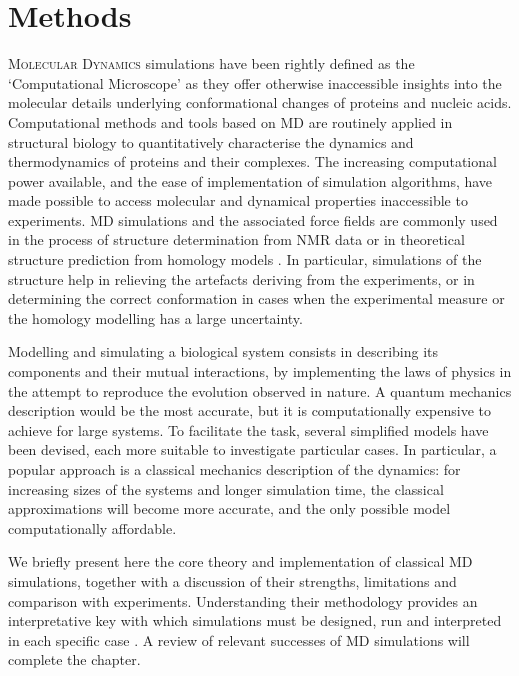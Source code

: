 \chapter{Methods} \label{chapter:MD}

\lettrine{M}{olecular Dynamics} simulations have been rightly defined as the `Computational Microscope' \citep{Lee2009,Dror2012} as they offer otherwise inaccessible insights into the molecular details underlying conformational changes of proteins and nucleic acids. Computational methods and tools based on MD are routinely applied in structural biology to quantitatively characterise the dynamics and thermodynamics of proteins and their complexes. The increasing computational power available, and the 
ease of implementation of simulation algorithms,
have made possible to access molecular and dynamical properties inaccessible to experiments. MD simulations and the associated force fields are commonly used in the process of structure determination from NMR data or in theoretical structure prediction from homology models \citep{Vogel2017,Heo2018}. In particular, simulations of the structure help in relieving the artefacts deriving from the experiments, or in determining the correct conformation in cases when the experimental measure or the homology modelling has a large uncertainty.

Modelling and simulating a biological system consists in describing its components and their mutual interactions, by implementing the laws of physics in the attempt to reproduce the evolution observed in nature. A quantum mechanics description would be the most accurate, but it is computationally expensive to achieve for large systems. To facilitate the task, several simplified models have been devised, each more suitable to investigate particular cases.
%
In particular, a popular approach is a classical mechanics description of the dynamics: for increasing sizes of the systems and longer simulation time, the classical approximations will become more accurate, and the only possible model computationally affordable.

We briefly present here the core theory and implementation of classical MD simulations, together with a discussion of their strengths, limitations and comparison with experiments. Understanding their methodology provides an interpretative key with which simulations must be designed, run and interpreted in each specific case \citep{vanGunsteren2006}. A review of relevant successes of MD simulations will complete the chapter.


